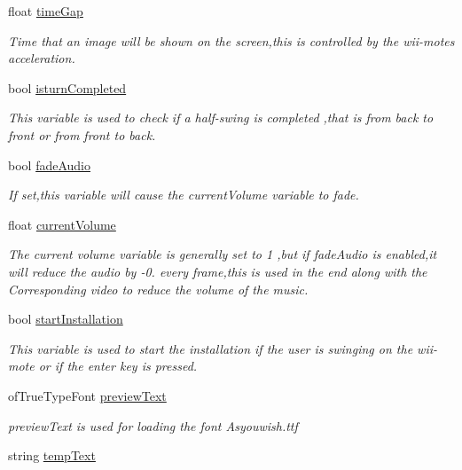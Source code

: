 \begin{DoxyCompactItemize}
float \hyperlink{classtest_app_a944f2713019239a4b49241a5cc9a00c9}{time\-Gap}
\begin{DoxyCompactList}\small\item\em Time that an image will be shown on the screen,this is controlled by the wii-\/motes acceleration. \end{DoxyCompactList}\item 
bool \hyperlink{classtest_app_a42478a80a90ce9f663c04bcdaea5c5bd}{isturn\-Completed}
\begin{DoxyCompactList}\small\item\em This variable is used to check if a half-\/swing is completed ,that is from back to front or from front to back. \end{DoxyCompactList}\item 
bool \hyperlink{classtest_app_a918c09b5a4389a8402cfacb25d390226}{fade\-Audio}
\begin{DoxyCompactList}\small\item\em If set,this variable will cause the current\-Volume variable to fade. \end{DoxyCompactList}\item 
float \hyperlink{classtest_app_a51c20c5432d9f6b06f719526d9a34ee6}{current\-Volume}
\begin{DoxyCompactList}\small\item\em The current volume variable is generally set to 1 ,but if fade\-Audio is enabled,it will reduce the audio by -\/0. every frame,this is used in the end along with the Corresponding video to reduce the volume of the music. \end{DoxyCompactList}\item 
bool \hyperlink{classtest_app_a8a65a6d1a473417cec1c2ac2e6116aae}{start\-Installation}
\begin{DoxyCompactList}\small\item\em This variable is used to start the installation if the user is swinging on the wii-\/mote or if the enter key is pressed. \end{DoxyCompactList}\item 
of\-True\-Type\-Font \hyperlink{classtest_app_af5b1af55af2256ef3751de075fc7a9cc}{preview\-Text}
\begin{DoxyCompactList}\small\item\em preview\-Text is used for loading the font Asyouwish.\-ttf \end{DoxyCompactList}\item 
string \hyperlink{classtest_app_ad9a4beab6f2e0f13d32b00b502e89bdc}{temp\-Text}

\end{DoxyCompactItemize}
